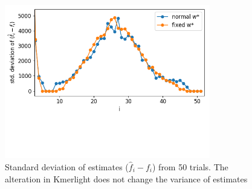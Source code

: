 \begin{figure}
\centerline{\includegraphics[width=0.8\textwidth, trim={0cm, 3.5cm, 0cm, 0cm}, clip]{images/std_deviations_comparison.png}}
\caption[Variance of normal Kmerlight and Kmerlight with fixed $w^*$]{Standard deviation of estimates
($\hat f_i - f_i$) from 50 trials. The alteration in Kmerlight does not change the variance of estimates}
\label{img:std-new-algorithm}
\end{figure}

